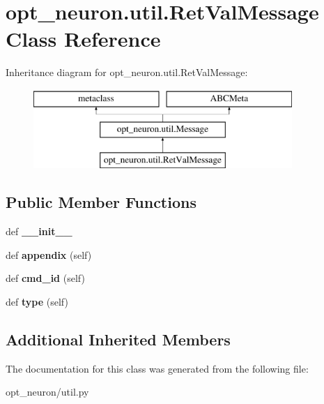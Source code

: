 \hypertarget{classopt__neuron_1_1util_1_1RetValMessage}{}\section{opt\+\_\+neuron.\+util.\+Ret\+Val\+Message Class Reference}
\label{classopt__neuron_1_1util_1_1RetValMessage}
Inheritance diagram for opt\+\_\+neuron.\+util.\+Ret\+Val\+Message\+:\begin{figure}[H]
\begin{center}
\leavevmode
\includegraphics[height=3.000000cm]{classopt__neuron_1_1util_1_1RetValMessage}
\end{center}
\end{figure}
\subsection*{Public Member Functions}
\begin{DoxyCompactItemize}
\item 
\hypertarget{classopt__neuron_1_1util_1_1RetValMessage_aeb8d852b9b862fde597ce0a92c2146a7}{}def {\bfseries \+\_\+\+\_\+init\+\_\+\+\_\+}\label{classopt__neuron_1_1util_1_1RetValMessage_aeb8d852b9b862fde597ce0a92c2146a7}

\item 
\hypertarget{classopt__neuron_1_1util_1_1RetValMessage_afdb43ad240de3ca349c0e0c7a1ae8617}{}def {\bfseries appendix} (self)\label{classopt__neuron_1_1util_1_1RetValMessage_afdb43ad240de3ca349c0e0c7a1ae8617}

\item 
\hypertarget{classopt__neuron_1_1util_1_1RetValMessage_a3ca5b6a7b898f583f15009dd94727a85}{}def {\bfseries cmd\+\_\+id} (self)\label{classopt__neuron_1_1util_1_1RetValMessage_a3ca5b6a7b898f583f15009dd94727a85}

\item 
\hypertarget{classopt__neuron_1_1util_1_1RetValMessage_ab0ca46a68582f092def08437ee57c506}{}def {\bfseries type} (self)\label{classopt__neuron_1_1util_1_1RetValMessage_ab0ca46a68582f092def08437ee57c506}

\end{DoxyCompactItemize}
\subsection*{Additional Inherited Members}


The documentation for this class was generated from the following file\+:\begin{DoxyCompactItemize}
\item 
opt\+\_\+neuron/util.\+py\end{DoxyCompactItemize}
